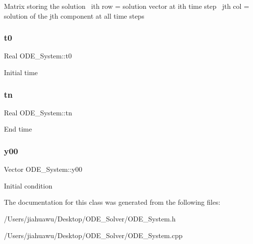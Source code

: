 Matrix storing the solution~\newline
ith row = solution vector at ith time step~\newline
jth col = solution of the jth component at all time steps \mbox{\label{class_o_d_e___system_a1947b357608babc98c5e79d645e24c3c}} 
\subsubsection{\texorpdfstring{t0}{t0}}
{\footnotesize\ttfamily Real O\+D\+E\+\_\+\+System\+::t0\hspace{0.3cm}{\ttfamily [protected]}}

Initial time \mbox{\label{class_o_d_e___system_a5c5a0dd9f04dfb8d8a84d49b741773af}} 
\subsubsection{\texorpdfstring{tn}{tn}}
{\footnotesize\ttfamily Real O\+D\+E\+\_\+\+System\+::tn\hspace{0.3cm}{\ttfamily [protected]}}

End time \mbox{\label{class_o_d_e___system_a1379137a4480e5861fd1911bc061f908}} 
\subsubsection{\texorpdfstring{y00}{y00}}
{\footnotesize\ttfamily Vector O\+D\+E\+\_\+\+System\+::y00\hspace{0.3cm}{\ttfamily [protected]}}

Initial condition 

The documentation for this class was generated from the following files\+:\begin{DoxyCompactItemize}
\item 
/\+Users/jiahuawu/\+Desktop/\+O\+D\+E\+\_\+\+Solver/O\+D\+E\+\_\+\+System.\+h\item 
/\+Users/jiahuawu/\+Desktop/\+O\+D\+E\+\_\+\+Solver/O\+D\+E\+\_\+\+System.\+cpp\end{DoxyCompactItemize}
